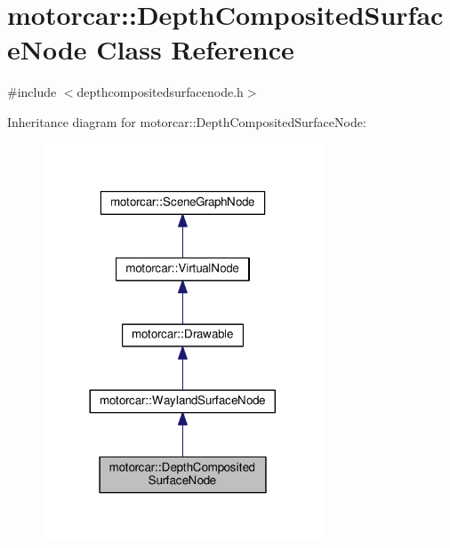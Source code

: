 \hypertarget{classmotorcar_1_1DepthCompositedSurfaceNode}{\section{motorcar\-:\-:Depth\-Composited\-Surface\-Node Class Reference}
\label{classmotorcar_1_1DepthCompositedSurfaceNode}
}


{\ttfamily \#include $<$depthcompositedsurfacenode.\-h$>$}



Inheritance diagram for motorcar\-:\-:Depth\-Composited\-Surface\-Node\-:
\nopagebreak
\begin{figure}[H]
\begin{center}
\leavevmode
\includegraphics[width=236pt]{classmotorcar_1_1DepthCompositedSurfaceNode__inherit__graph}
\end{center}
\end{figure}


